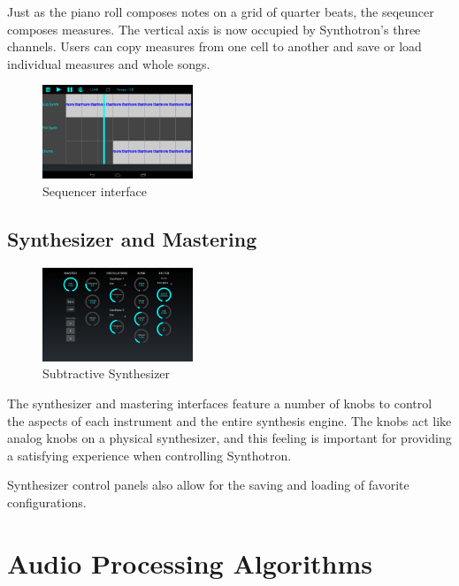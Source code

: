 \documentclass[letterpaper,12pt]{article}
\begin{document}
Just as the piano roll composes notes on a grid of quarter beats, the seqeuncer composes measures. The vertical axis is now occupied by Synthotron's three channels. Users can copy measures from one cell to another and save or load individual measures and whole songs.

\begin{figure}[h]
\centering
\includegraphics[width=0.4\textwidth]{figures/sequencer.png}
\caption{Sequencer interface}
\label{fig:sequencer}
\end{figure}

\subsection{Synthesizer and Mastering}

\begin{figure}
\centering
\includegraphics[width=0.4\textwidth]{figures/subtractivesynth.png}
\caption{Subtractive Synthesizer}
\label{fig:subtractivesynth}
\end{figure}

The synthesizer and mastering interfaces feature a number of knobs to control the aspects of each instrument and the entire synthesis engine. The knobs act like analog knobs on a physical synthesizer, and this feeling is important for providing a satisfying experience when controlling Synthotron.

Synthesizer control panels also allow for the saving and loading of favorite configurations.



\section{Audio Processing Algorithms}
\end{document}

